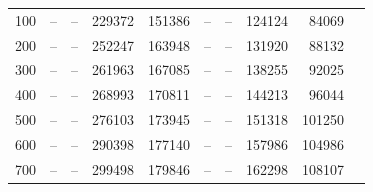 \begin{table}[htp]
{\begin{tabular}{|r|r|r|r|r|r|r|r|r|r|}
   100& --      & --      &  229372   & 151386 &  --    &  --   & 124124 & 84069  \\
   200& --      & --      &  252247   & 163948 &  --    &  --   & 131920 & 88132  \\
   300& --      & --      &  261963   & 167085 &  --    &  --   & 138255 & 92025  \\
   400& --      & --      &  268993   & 170811 &  --    &  --   & 144213 & 96044  \\
   500& --      & --      &  276103   & 173945 &  --    &  --   & 151318 & 101250 \\
   600& --      & --      &  290398   & 177140 &  --    &  --   & 157986 & 104986 \\
   700& --      & --      &  299498   & 179846 &  --    &  --   & 162298 & 108107 \\
   \hline
  \end{tabular}}
\end{table}





